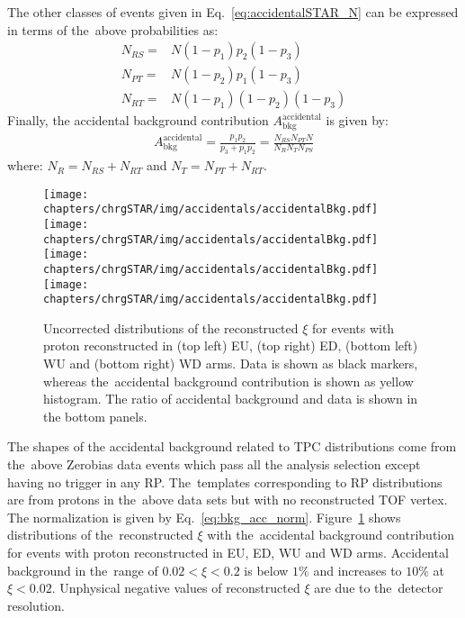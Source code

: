 The other classes of events given in Eq.~\eqref{eq:accidentalSTAR_N} can be expressed in terms of the~above probabilities as:
\begin{equation}
\begin{split}
N_{RS}=  & N(1-p_1)p_2(1-p_3)\\
N_{PT} = & N(1-p_2)p_1(1-p_3)\\
N_{RT} = & N(1-p_1)(1-p_2)(1-p_3)
\end{split}
\end{equation}
Finally, the accidental background contribution $A_{\mathrm{bkg} }^{\mathrm{accidental}}$ is  given by:
\begin{equation}
\begin{split}
A_{\mathrm{bkg}}^{\mathrm{accidental}}=  \frac{p_1p_2}{p_3+p_1p_2}=\frac{N_{RS}N_{PT}N}{N_{R}N_{T}N_{PS}}
\end{split}
\label{eq:bkg_acc_norm}
\end{equation} 
where: $N_{R}=N_{RS}+N_{RT}$ and $N_{T}=N_{PT}+N_{RT}$.


\begin{figure}[b!]
	\centering
	\texttt{[image: chapters/chrgSTAR/img/accidentals/accidentalBkg.pdf]}
	\texttt{[image: chapters/chrgSTAR/img/accidentals/accidentalBkg.pdf]}
	\texttt{[image: chapters/chrgSTAR/img/accidentals/accidentalBkg.pdf]}
	\texttt{[image: chapters/chrgSTAR/img/accidentals/accidentalBkg.pdf]}
	\caption{Uncorrected distributions of the reconstructed $\xi$ for events with proton reconstructed in  (top left) EU, (top right) ED, (bottom left) WU and (bottom right) WD arms. Data is shown as black markers, whereas the~accidental background contribution is shown as yellow histogram.  The ratio of accidental background and data is shown in the bottom panels.}
	\label{fig:STARaccidentalsXi}
\end{figure}
The shapes of the accidental background related to TPC distributions come from the~above Zerobias data events which pass all the analysis selection except having no trigger in any RP. The~templates corresponding to RP distributions are from protons in the~above data sets but with no reconstructed TOF vertex. The normalization is given by Eq.~\eqref{eq:bkg_acc_norm}. Figure~\ref{fig:STARaccidentalsXi} shows distributions of the~reconstructed $\xi$ with the~accidental background contribution  for events with proton reconstructed in EU, ED, WU and WD arms. Accidental background in the~range of $0.02<\xi<0.2$ is below $1\%$ and increases to $10\%$ at $\xi<0.02$. Unphysical negative values of reconstructed $\xi$ are due to the~detector resolution.




